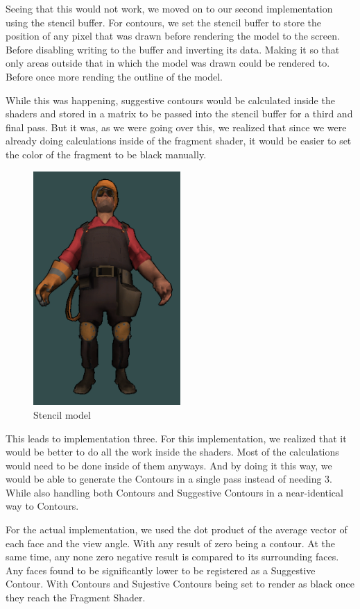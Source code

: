 Seeing that this would not work, we moved on to our second implementation using the stencil buffer. For contours, we set the stencil buffer to store the position of any pixel that was drawn before rendering the model to the screen. Before disabling writing to the buffer and inverting its data. Making it so that only areas outside that in which the model was drawn could be rendered to. Before once more rending the outline of the model.

While this was happening, suggestive contours would be calculated inside the shaders and stored in a matrix to be passed into the stencil buffer for a third and final pass. But it was, as we were going over this, we realized that since we were already doing calculations inside of the fragment shader, it would be easier to set the color of the fragment to be black manually.

\begin{figure}[h]
    \centering
    \includegraphics[width=0.5\textwidth]{img/ModelD.png}
    \caption{Stencil model}
    \label{fig-render-overview}
\end{figure}

This leads to implementation three. For this implementation, we realized that it would be better to do all the work inside the shaders. Most of the calculations would need to be done inside of them anyways. And by doing it this way, we would be able to generate the Contours in a single pass instead of needing 3. While also handling both Contours and Suggestive Contours in a near-identical way to Contours.

For the actual implementation, we used the dot product of the average vector of each face and the view angle. With any result of zero being a contour. At the same time, any none zero negative result is compared to its surrounding faces. Any faces found to be significantly lower to be registered as a Suggestive Contour. With Contours and Sujestive Contours being set to render as black once they reach the Fragment Shader.